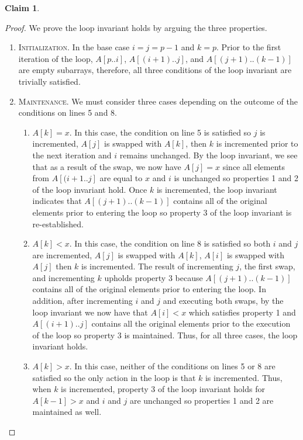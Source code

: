 \documentclass[11pt]{article}
\newtheorem{claim}[theorem]{Claim}
\theoremstyle{nonumberplain}
\newtheorem{proof}{Proof}
\begin{document}
\begin{enumerate}
\begin{claim}
\begin{enumerate}
 \end{enumerate}
\end{claim}
\begin{proof}
 We prove the loop invariant holds by arguing the three properties.
 \begin{enumerate}
     \item \textsc{Initialization}. In the base case $i=j=p-1$ and $k=p$. Prior to the first iteration of the loop, $A[p..i]$, $A[(i+1)..j]$, and $A[(j+1)..(k-1)]$ are empty subarrays, therefore, all three conditions of the loop invariant are trivially satisfied.
     \item \textsc{Maintenance}. We must consider three cases depending on the outcome of the conditions on lines 5 and 8. \\
     \begin{enumerate}
         \item $A[k]=x$. In this case, the condition on line 5 is satisfied so $j$ is incremented, $A[j]$ is swapped with $A[k]$, then $k$ is incremented prior to the next iteration and $i$ remains unchanged. By the loop invariant, we see that as a result of the swap, we now have $A[j]=x$ since all elements from $A[(i+1..j]$ are equal to $x$ and $i$ is unchanged so properties 1 and 2 of the loop invariant hold. Once $k$ is incremented, the loop invariant indicates that $A[(j+1)..(k-1)]$ contains all of the original elements prior to entering the loop so property 3 of the loop invariant is re-established. 
        \item $A[k]<x$. In this case, the condition on line 8 is satisfied so both $i$ and $j$ are incremented, $A[j]$ is swapped with $A[k]$, $A[i]$ is swapped with $A[j]$ then $k$ is incremented. The result of incrementing $j$, the first swap, and incrementing $k$ upholds property 3 because $A[(j+1)..(k-1)]$ contains all of the original elements prior to entering the loop. In addition, after incrementing $i$ and $j$ and executing both swaps, by the loop invariant we now have that $A[i]<x$ which satisfies property 1 and $A[(i+1)..j]$ contains all the original elements prior to the execution of the loop so property 3 is maintained. Thus, for all three cases, the loop invariant holds.  
        \item $A[k]>x$. In this case, neither of the conditions on lines 5 or 8 are satisfied so the only action in the loop is that $k$ is incremented. Thus, when $k$ is incremented, property 3 of the loop invariant holds for $A[k-1]>x$ and $i$ and $j$ are unchanged so properties 1 and 2 are maintained as well. 

\end{enumerate}
\end{enumerate}
\end{proof}
\end{enumerate}
\end{document}
